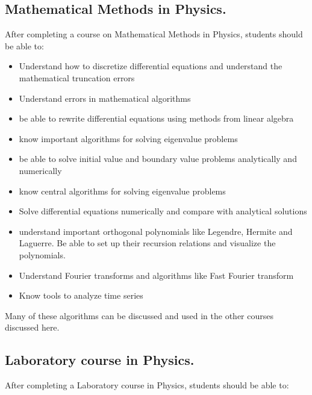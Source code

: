 \documentclass[graybox,envcountchap,sectrefs]{svmult}
\begin{document}
\subsection{Mathematical Methods in  Physics.}
After completing a course on Mathematical Methods in Physics, students should be able to:
\begin{itemize}
\item Understand how to discretize differential equations and understand the mathematical truncation errors

\item Understand errors in mathematical algorithms

\item be able to rewrite differential equations using methods from linear algebra

\item know important algorithms for solving eigenvalue problems

\item be able to solve initial value and boundary value problems analytically and numerically

\item know central algorithms for solving eigenvalue problems

\item Solve differential equations numerically and compare with analytical solutions

\item understand  important orthogonal polynomials like Legendre, Hermite and Laguerre. Be able to set up their recursion relations and visualize the polynomials.

\item Understand Fourier transforms and algorithms like Fast Fourier transform

\item Know tools to analyze time series
\end{itemize}


Many of these algorithms can be discussed and used in the other courses discussed here.

\subsection{Laboratory course in Physics.}
After completing a  Laboratory course in Physics, students should be able to:
\end{document}
